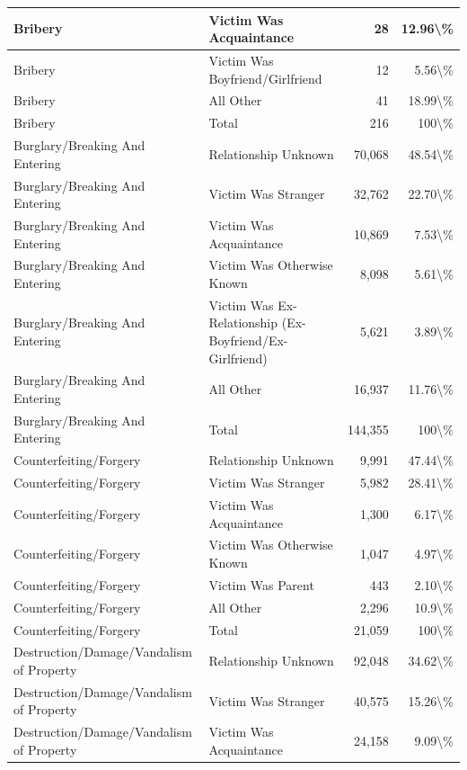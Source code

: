 \documentclass[
]{krantz}
\begin{document}
\begin{longtable}[t]{l|l|r|r}
\hline
Bribery & Victim Was Acquaintance & 28 & 12.96\textbackslash{}\%\\
\hline
Bribery & Victim Was Boyfriend/Girlfriend & 12 & 5.56\textbackslash{}\%\\
\hline
Bribery & All Other & 41 & 18.99\textbackslash{}\%\\
\hline
Bribery & Total & 216 & 100\textbackslash{}\%\\
\hline
Burglary/Breaking And Entering & Relationship Unknown & 70,068 & 48.54\textbackslash{}\%\\
\hline
Burglary/Breaking And Entering & Victim Was Stranger & 32,762 & 22.70\textbackslash{}\%\\
\hline
Burglary/Breaking And Entering & Victim Was Acquaintance & 10,869 & 7.53\textbackslash{}\%\\
\hline
Burglary/Breaking And Entering & Victim Was Otherwise Known & 8,098 & 5.61\textbackslash{}\%\\
\hline
Burglary/Breaking And Entering & Victim Was Ex-Relationship (Ex-Boyfriend/Ex-Girlfriend) & 5,621 & 3.89\textbackslash{}\%\\
\hline
Burglary/Breaking And Entering & All Other & 16,937 & 11.76\textbackslash{}\%\\
\hline
Burglary/Breaking And Entering & Total & 144,355 & 100\textbackslash{}\%\\
\hline
Counterfeiting/Forgery & Relationship Unknown & 9,991 & 47.44\textbackslash{}\%\\
\hline
Counterfeiting/Forgery & Victim Was Stranger & 5,982 & 28.41\textbackslash{}\%\\
\hline
Counterfeiting/Forgery & Victim Was Acquaintance & 1,300 & 6.17\textbackslash{}\%\\
\hline
Counterfeiting/Forgery & Victim Was Otherwise Known & 1,047 & 4.97\textbackslash{}\%\\
\hline
Counterfeiting/Forgery & Victim Was Parent & 443 & 2.10\textbackslash{}\%\\
\hline
Counterfeiting/Forgery & All Other & 2,296 & 10.9\textbackslash{}\%\\
\hline
Counterfeiting/Forgery & Total & 21,059 & 100\textbackslash{}\%\\
\hline
Destruction/Damage/Vandalism of Property & Relationship Unknown & 92,048 & 34.62\textbackslash{}\%\\
\hline
Destruction/Damage/Vandalism of Property & Victim Was Stranger & 40,575 & 15.26\textbackslash{}\%\\
\hline
Destruction/Damage/Vandalism of Property & Victim Was Acquaintance & 24,158 & 9.09\textbackslash{}\%\\

\end{longtable}
\end{document}
